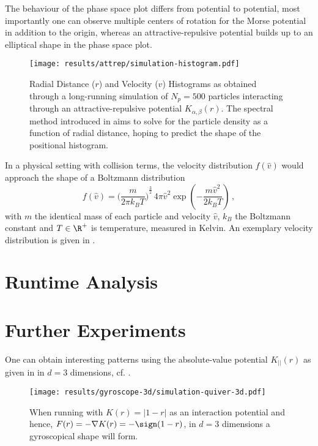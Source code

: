 The behaviour of the phase space plot differs from potential to potential, most importantly one can observe multiple centers of rotation for the Morse potential in addition to the origin, whereas an attractive-repulsive potential builds up to an elliptical shape in the phase space plot.

\begin{figure}[H]
  \centering
  \texttt{[image: results/attrep/simulation-histogram.pdf]}
  \caption[Radial Distance and Velocity Histograms of attractive-repulsive Simulation Output in 1D]{Radial Distance ($r$) and Velocity ($v$) Histograms as obtained through a long-running simulation of $N_p = 500$ particles interacting through an attractive-repulsive potential $K_{\alpha, \beta}(r)$. The spectral method introduced in  aims to solve for the particle density as a function of radial distance, hoping to predict the shape of the positional histogram.}
  \label{fig:simulation-histogram}
\end{figure}

In a physical setting with collision terms, the velocity distribution $f(\hat{v})$ would approach the shape of a Boltzmann distribution
$$f(\hat{v})={\bigg(\frac{m}{2\pi k_B T}\bigg)}^{\frac {3}{2}}\,4\pi \hat{v}^{2}\exp \left(-{\frac {m \hat{v}^{2}}{2k_B T}}\right)\,,$$
with $m$ the identical mass of each particle and velocity $\hat{v}$, $k_B$ the Boltzmann constant and $T \in \R^+$ is temperature, measured in Kelvin.
An exemplary velocity distribution is given in .

\section{Runtime Analysis}
\hierKoennteIhreWerbungStehen

\section{Further Experiments}
One can obtain interesting patterns using the absolute-value potential $K_{||}(r)$ as given in  in $d=3$ dimensions, cf. .
\begin{figure}[H]
  \centering
  \texttt{[image: results/gyroscope-3d/simulation-quiver-3d.pdf]}
  \caption{When running with $K(r) = |1-r|$ as an interaction potential and hence, $F(r) = -\nabla K(r) = -\sign(1-r)$, in $d=3$ dimensions a gyroscopical shape will form.}
  \label{fig:gyroscope-quiver-3d}
\end{figure}

